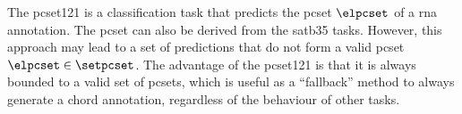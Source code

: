 
The \gls{pcset121} is a classification task that predicts
the \gls{pcset} $\elpcset$ of a \gls{rna} annotation. The
\gls{pcset} can also be derived from the \gls{satb35} tasks.
However, this approach may lead to a set of predictions that
do not form a valid \gls{pcset} $\elpcset \in \setpcset$.
The advantage of the \gls{pcset121} is that it is always
bounded to a valid set of \gls{pcset}s, which is useful as a
``fallback'' method to always generate a chord annotation,
regardless of the behaviour of other tasks.




